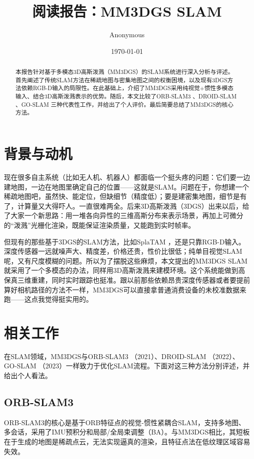\documentclass[12pt,a4paper,onecolumn]{article}
\begin{document}
\title{\textbf{阅读报告：MM3DGS SLAM}}
\author{Anonymous}
\date{\today}
\maketitle

\begin{abstract}
本报告针对基于多模态3D高斯泼溅（MM3DGS）的SLAM系统进行深入分析与评述\cite{MM3DGS}。首先阐述了传统SLAM方法在稀疏地图与密集地图之间的权衡困境，以及现有3DGS方法依赖RGB-D输入的局限性。在此基础上，介绍了MM3DGS采用纯视觉+惯性多模态输入、结合3D高斯泼溅表示的优势。随后，本文比较了ORB-SLAM3 \cite{ORB-SLAM3}、DROID-SLAM \cite{DROID-SLAM}、GO-SLAM \cite{GO-SLAM}三种代表性工作，并给出了个人评价。最后简要总结了MM3DGS的核心方法。
\end{abstract}

\section{背景与动机}

现在很多自主系统（比如无人机、机器人）都面临一个挺头疼的问题：它们要一边建地图，一边在地图里确定自己的位置——这就是SLAM。问题在于，你想建一个稀疏地图吧，虽然快、能定位，但缺细节（精度低）；要是建密集地图，细节是有了，计算量又大得吓人。一直很难两全。后来3D高斯泼溅（3DGS）出来以后，给了大家一个新思路：用一堆各向异性的三维高斯分布来表示场景，再加上可微分的“泼溅”光栅化渲染，既能保证渲染质量，又能跑到实时帧率。

但现有的那些基于3DGS的SLAM方法，比如SplaTAM \cite{SplaTAM}，还是只靠RGB-D输入。深度传感器一远就噪声大、精度差，价格还贵，性价比很低；纯单目视觉SLAM呢，又有尺度模糊的问题。所以为了摆脱这些麻烦，本文提出的MM3DGS SLAM \cite{MM3DGS}就采用了一个多模态的办法，同样用3D高斯泼溅来建模环境。这个系统能做到高保真三维重建，同时实时跟踪也挺准。跟以前那些依赖昂贵深度传感器或者要提前算好相机路径的方法不一样，MM3DGS可以直接拿普通消费设备的未校准数据来跑——这点我觉得挺实用的。

\section{相关工作}
在SLAM领域，MM3DGS与ORB-SLAM3 \cite{ORB-SLAM3}（2021）、DROID-SLAM \cite{DROID-SLAM}（2022）、GO-SLAM \cite{GO-SLAM}（2023）一样致力于优化SLAM流程。下面对这三种方法分别评述，并给出个人看法。

\subsection{ORB-SLAM3 \cite{ORB-SLAM3}}
ORB-SLAM3的核心是基于ORB特征点的视觉-惯性紧耦合SLAM，支持多地图、多会话，采用了IMU预积分和局部/全局束调整（BA）。与MM3DGS相比，其短板在于生成的地图是稀疏点云，无法实现逼真的渲染，且特征点法在低纹理区域容易失效。
\end{document}
